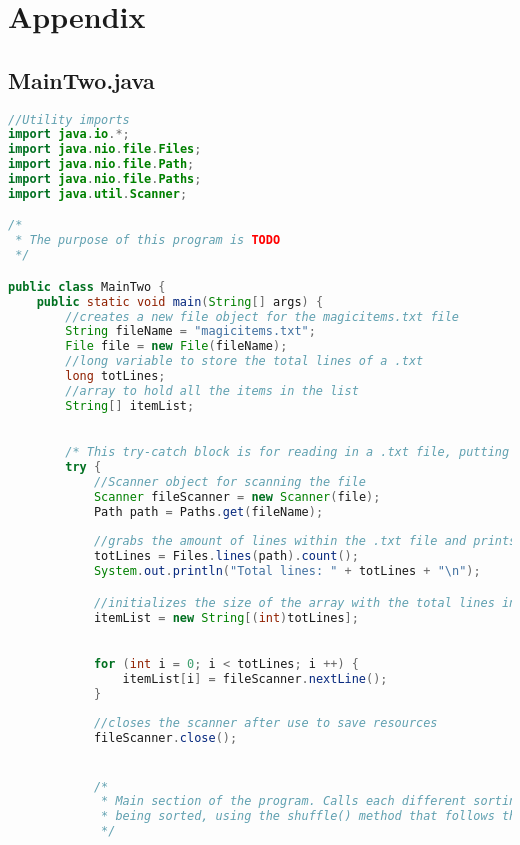 \documentclass[letterpaper, 10pt,DIV=13]{scrartcl}
\numberwithin{equation}{section} %
\numberwithin{figure}{section} %
\numberwithin{table}{section} %
\begin{document}
\section{Appendix}

\subsection{MainTwo.java}
\begin{lstlisting}[frame=single, breaklines, language=java]  
//Utility imports
import java.io.*;
import java.nio.file.Files;
import java.nio.file.Path;
import java.nio.file.Paths;
import java.util.Scanner;

/* 
 * The purpose of this program is TODO
 */

public class MainTwo {
    public static void main(String[] args) {
        //creates a new file object for the magicitems.txt file
        String fileName = "magicitems.txt";
        File file = new File(fileName);
        //long variable to store the total lines of a .txt
        long totLines;
        //array to hold all the items in the list
        String[] itemList;

        
        /* This try-catch block is for reading in a .txt file, putting each line onto an array, and throwing exceptions if there are any. */
        try {
            //Scanner object for scanning the file
            Scanner fileScanner = new Scanner(file);
            Path path = Paths.get(fileName);
            
            //grabs the amount of lines within the .txt file and prints it
            totLines = Files.lines(path).count();
            System.out.println("Total lines: " + totLines + "\n");

            //initializes the size of the array with the total lines in the .txt
            itemList = new String[(int)totLines];

            
            for (int i = 0; i < totLines; i ++) {
                itemList[i] = fileScanner.nextLine();
            }
            
            //closes the scanner after use to save resources
            fileScanner.close();


            /* 
             * Main section of the program. Calls each different sorting algorithm and prints output. The array is shuffled each time before
             * being sorted, using the shuffle() method that follows the Knuth shuffle algorithm. 
             */


\end{lstlisting}
\end{document}
